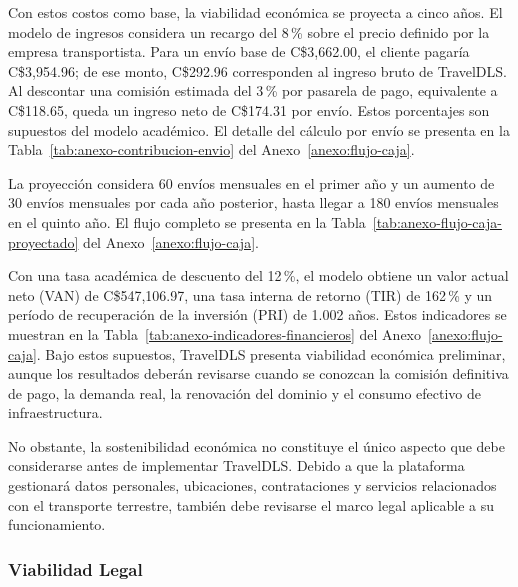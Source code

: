 Con estos costos como base, la viabilidad económica se proyecta a cinco años. El modelo de ingresos considera un recargo del 8\,\% sobre el precio definido por la empresa transportista. Para un envío base de C\$3,662.00, el cliente pagaría C\$3,954.96; de ese monto, C\$292.96 corresponden al ingreso bruto de TravelDLS. Al descontar una comisión estimada del 3\,\% por pasarela de pago, equivalente a C\$118.65, queda un ingreso neto de C\$174.31 por envío. Estos porcentajes son supuestos del modelo académico. El detalle del cálculo por envío se presenta en la Tabla~\ref{tab:anexo-contribucion-envio} del Anexo~\ref{anexo:flujo-caja}.

La proyección considera 60 envíos mensuales en el primer año y un aumento de 30 envíos mensuales por cada año posterior, hasta llegar a 180 envíos mensuales en el quinto año. El flujo completo se presenta en la Tabla~\ref{tab:anexo-flujo-caja-proyectado} del Anexo~\ref{anexo:flujo-caja}.

Con una tasa académica de descuento del 12\,\%, el modelo obtiene un valor actual neto (VAN) de C\$547,106.97, una tasa interna de retorno (TIR) de 162\,\% y un período de recuperación de la inversión (PRI) de 1.002 años. Estos indicadores se muestran en la Tabla~\ref{tab:anexo-indicadores-financieros} del Anexo~\ref{anexo:flujo-caja}. Bajo estos supuestos, TravelDLS presenta viabilidad económica preliminar, aunque los resultados deberán revisarse cuando se conozcan la comisión definitiva de pago, la demanda real, la renovación del dominio y el consumo efectivo de infraestructura.

No obstante, la sostenibilidad económica no constituye el único aspecto que debe considerarse antes de implementar TravelDLS. Debido a que la plataforma gestionará datos personales, ubicaciones, contrataciones y servicios relacionados con el transporte terrestre, también debe revisarse el marco legal aplicable a su funcionamiento.

\subsubsection{Viabilidad Legal}

